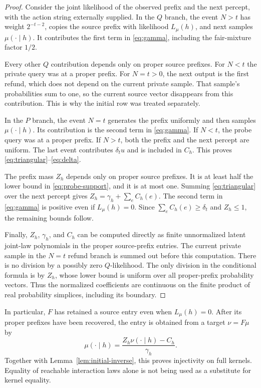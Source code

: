 \documentclass[11pt]{article}
\theoremstyle{definition}
\theoremstyle{remark}
\begin{document}
\begin{proof}
Consider the joint likelihood of the observed prefix and the next
percept, with the action string externally supplied.  In the $Q$
branch, the event $N>t$ has weight $2^{-t-2}$, copies the source
prefix with likelihood $L_\mu(h)$, and next samples
$\mu(\cdot\mid h)$.  It contributes the first term in
\eqref{eq:gamma}, including the fair-mixture factor $1/2$.

Every other $Q$ contribution depends only on proper source prefixes.
For $N<t$ the private query was at a proper prefix.  For $N=t>0$,
the next output is the first refund, which does not depend on the
current private sample.  That sample's probabilities sum to one,
so the current source vector disappears from this contribution.
This is why the initial row was treated separately.

In the $P$ branch, the event $N=t$ generates the prefix uniformly and
then samples $\mu(\cdot\mid h)$.  Its contribution is the second
term in \eqref{eq:gamma}.  If $N<t$, the probe query was at a proper
prefix.  If $N>t$, both the prefix and the next percept are uniform.
The last event contributes $\delta_tu$ and is included in $C_h$.
This proves \eqref{eq:triangular}--\eqref{eq:delta}.

The prefix mass $Z_h$ depends only on proper source prefixes.  It is
at least half the lower bound in \eqref{eq:probe-support}, and it is
at most one.  Summing \eqref{eq:triangular} over the next percept
gives $Z_h=\gamma_h+\sum_eC_h(e)$.  The second term in
\eqref{eq:gamma} is positive even if $L_\mu(h)=0$.  Since
$\sum_eC_h(e)\ge\delta_t$ and $Z_h\le1$, the remaining bounds
follow.

Finally, $Z_h$, $\gamma_h$, and $C_h$ can be computed directly as
finite unnormalized latent joint-law polynomials in the proper
source-prefix entries.  The current private sample in the $N=t$
refund branch is summed out before this computation.  There is no
division by a possibly zero $Q$-likelihood.  The only division in the
conditional formula is by $Z_h$, whose lower bound is uniform over
all proper-prefix probability vectors.  Thus the normalized
coefficients are continuous on the finite product of real
probability simplices, including its boundary.
\end{proof}

In particular, $F$ has retained a source entry even when
$L_\mu(h)=0$.  After its proper prefixes have been recovered, the
entry is obtained from a target $\nu=F\mu$ by
\begin{equation}
  \mu(\cdot\mid h)=
       \frac{Z_h\nu(\cdot\mid h)-C_h}{\gamma_h}.
  \label{eq:full-inverse}
\end{equation}
Together with Lemma~\ref{lem:initial-inverse}, this proves injectivity
on full kernels.  Equality of reachable interaction laws alone is
not being used as a substitute for kernel equality.
\end{document}
